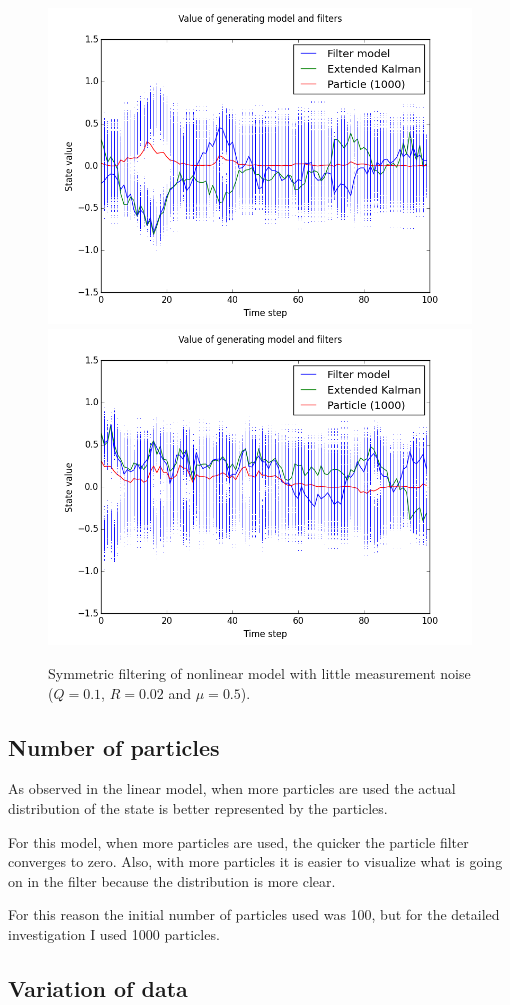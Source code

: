 \documentclass[paper=a4, fontsize=11pt]{scrartcl} %
\numberwithin{equation}{section} %
\numberwithin{figure}{section} %
\numberwithin{table}{section} %
\begin{document}
\begin{figure}
\centerline{
\includegraphics[width=.7\textwidth]{fig/figure_15}
\includegraphics[width=.7\textwidth]{fig/figure_16}}
\caption{Symmetric filtering of nonlinear model with little measurement noise ($Q=0.1$, $R=0.02$ and $\mu=0.5$).}\label{fig:6}
\end{figure}

\subsection{Number of particles}

As observed in the linear model, when more particles are used the actual distribution of the state is better represented by the particles.

For this model, when more particles are used, the quicker the particle filter converges to zero. Also, with more particles it is easier to visualize what is going on in the filter because the distribution is more clear.

For this reason the initial number of particles used was 100, but for the detailed investigation I used 1000 particles.

\subsection{Variation of data}
\end{document}
